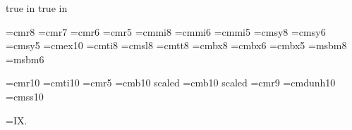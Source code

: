  true in
 true in




%

\font\eightrm=cmr8
\font\sevenrm=cmr7
\font\sixrm=cmr6
\font\fiverm=cmr5
\font\eighti=cmmi8
\font\sixi=cmmi6
\font\fivei=cmmi5
\font\eightsy=cmsy8
\font\sixsy=cmsy6
\font\fivesy=cmsy5
\font\tenex=cmex10
\font\eightit=cmti8
\font\eightsl=cmsl8
\font\eighttt=cmtt8
\font\eightbf=cmbx8
\font\sixbf=cmbx6
\font\fivebf=cmbx5
\font\eightmsb=msbm8
\font\sixmsb=msbm6

\def\eightpoint{\def\rm{\fam0\eightrm}%
  \textfont0=\eightrm \scriptfont0=\sixrm \scriptscriptfont0=\fiverm
  \textfont1=\eighti \scriptfont1=\sixi \scriptscriptfont1=\fivei
  \textfont2=\eightsy \scriptfont2=\sixsy \scriptscriptfont2=\fivesy
  \textfont3=\tenex \scriptfont3=\tenex \scriptscriptfont3=\tenex
  \textfont\itfam=\eightit  \def\it{\fam\itfam\eightit}%
  \textfont\slfam=\eightsl  \def\sl{\fam\slfam\eightsl}%
  \textfont\ttfam=\eighttt  \def\tt{\fam\ttfam\eighttt}%
  \textfont\bffam=\eightbf  \scriptfont\bffam=\sixbf
   \scriptscriptfont\bffam=\fivebf  \def\bf{\fam\bffam\eightbf}%
  \normalbaselineskip=9pt
  \setbox\strutbox=\hbox{\vrule height7pt depth2pt width0pt}%
  \let\sc=\sixrm  \normalbaselines\rm}


\font\dotless=cmr10 %
\font\itdotless=cmti10
\def\itumi{{\"{\itdotless\char'020}}}
\def\itumj{{\"{\itdotless\char'021}}}
\def\umi{{\"{\dotless\char'020}}}
\def\umj{{\"{\dotless\char'021}}}
\font\smaller=cmr5
\font\boldtitlefont=cmb10 scaled
\font\smallboldtitle=cmb10 scaled 
\font\ninerm=cmr9
\font\dun=cmdunh10 %
\font\Rfont=cmss10

\footline={\hfil {\tenrm IX.\folio}\hfil}

\def\eps{{\varepsilon}}
\def\Eps{{\epsilon}}
\def\kap{{\kappa}}
\def\lam{{\lambda}}
\def\Lam{{\Lambda}}
\def\mynabla{{\nabla\!}}

